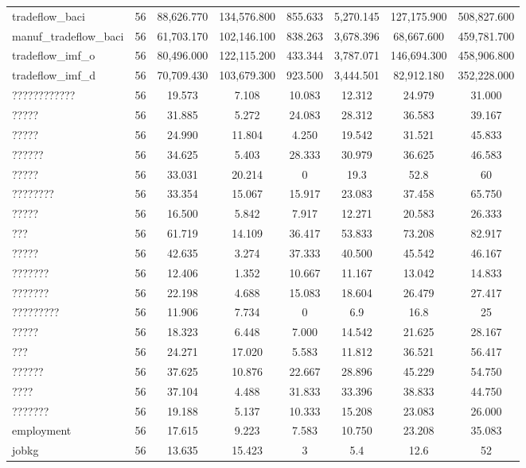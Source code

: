 \begin{table}[!htbp]
\begin{tabular}{@{\extracolsep{5pt}}lccccccc}
tradeflow\_baci & 56 & 88,626.770 & 134,576.800 & 855.633 & 5,270.145 & 127,175.900 & 508,827.600 \\ 
manuf\_tradeflow\_baci & 56 & 61,703.170 & 102,146.100 & 838.263 & 3,678.396 & 68,667.600 & 459,781.700 \\ 
tradeflow\_imf\_o & 56 & 80,496.000 & 122,115.200 & 433.344 & 3,787.071 & 146,694.300 & 458,906.800 \\ 
tradeflow\_imf\_d & 56 & 70,709.430 & 103,679.300 & 923.500 & 3,444.501 & 82,912.180 & 352,228.000 \\ 
???????????? & 56 & 19.573 & 7.108 & 10.083 & 12.312 & 24.979 & 31.000 \\ 
????? & 56 & 31.885 & 5.272 & 24.083 & 28.312 & 36.583 & 39.167 \\ 
????? & 56 & 24.990 & 11.804 & 4.250 & 19.542 & 31.521 & 45.833 \\ 
?????? & 56 & 34.625 & 5.403 & 28.333 & 30.979 & 36.625 & 46.583 \\ 
????? & 56 & 33.031 & 20.214 & 0 & 19.3 & 52.8 & 60 \\ 
???????? & 56 & 33.354 & 15.067 & 15.917 & 23.083 & 37.458 & 65.750 \\ 
????? & 56 & 16.500 & 5.842 & 7.917 & 12.271 & 20.583 & 26.333 \\ 
??? & 56 & 61.719 & 14.109 & 36.417 & 53.833 & 73.208 & 82.917 \\ 
????? & 56 & 42.635 & 3.274 & 37.333 & 40.500 & 45.542 & 46.167 \\ 
??????? & 56 & 12.406 & 1.352 & 10.667 & 11.167 & 13.042 & 14.833 \\ 
??????? & 56 & 22.198 & 4.688 & 15.083 & 18.604 & 26.479 & 27.417 \\ 
????????? & 56 & 11.906 & 7.734 & 0 & 6.9 & 16.8 & 25 \\ 
????? & 56 & 18.323 & 6.448 & 7.000 & 14.542 & 21.625 & 28.167 \\ 
??? & 56 & 24.271 & 17.020 & 5.583 & 11.812 & 36.521 & 56.417 \\ 
?????? & 56 & 37.625 & 10.876 & 22.667 & 28.896 & 45.229 & 54.750 \\ 
???? & 56 & 37.104 & 4.488 & 31.833 & 33.396 & 38.833 & 44.750 \\ 
??????? & 56 & 19.188 & 5.137 & 10.333 & 15.208 & 23.083 & 26.000 \\ 
employment & 56 & 17.615 & 9.223 & 7.583 & 10.750 & 23.208 & 35.083 \\ 
jobkg & 56 & 13.635 & 15.423 & 3 & 5.4 & 12.6 & 52 \\ 

\end{tabular}
\end{table}
